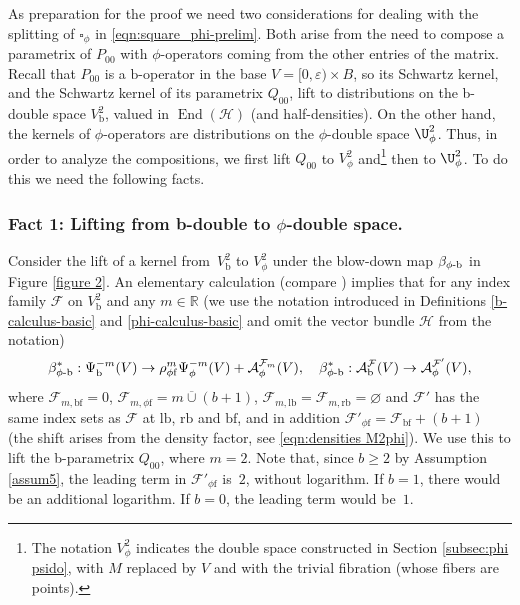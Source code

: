 \documentclass[JEP,XML,SOM,Unicode,NoFloatCountersInSection,published]{cedram}
\newcommand{\phib}{{\phi\textup{-}\bb}}
\theoremstyle{plain}
\theoremstyle{definition}
\newcommand{\R}{{\mathbb{R}}}
\newcommand{\Hmath}{{\mathscr{H}}}
\newcommand\calA{{\mathcal A}}
\newcommand\calF{{\mathcal F}}
\newcommand{\phif}{{\phi\mathrm{f}}}
\newcommand{\lf}{{\mathrm{lb}}}
\newcommand{\rf}{{\mathrm{rb}}}
\newcommand{\bb}{{\mathrm{b}}}
\newcommand{\bbf}{{\mathrm{bf}}}
\DeclareMathOperator{\End}{End}
\newcommand{\ocup}{\mathbin{\overline{\cup}}}
\begin{document}
As preparation for the proof we need two considerations for dealing with the splitting of $\square_\phi$ in
\eqref{eqn:square_phi-prelim}. Both arise from the need to compose a parametrix of $P_{00}$ with $\phi$\nobreakdash-operators coming from the other entries of the matrix. Recall that $P_{00}$ is a $\bb$\nobreakdash-operator in the base $V=[0,\varepsilon) \times B$, so its
Schwartz kernel, and the Schwartz kernel of its parametrix $Q_{00}$, lift to distributions on the b-double space
$V^2_\bb$, valued in $\End(\mathscr{H})$ (and half-densities). On the other hand, the kernels of $\phi$-operators are distributions on the $\phi$-double space $\U^2_\phi$. Thus, in order to analyze the compositions, we first lift $Q_{00}$ to $V^2_\phi$ and\footnote{The notation $V^2_\phi$ indicates the double space constructed in Section \ref{subsec:phi psido}, with $M$ replaced by $V$ and with the trivial fibration (whose fibers are points).} then to $\U^2_\phi$. To do this we need the following facts.

\subsubsection*{Fact 1: Lifting from b-double to $\phi$-double space.}

Consider the lift of a kernel from~$V^2_\bb$ to $V^2_\phi$ under the blow-down
map $\beta_{\phib}$ in Figure \ref{figure 2}. An elementary calculation
(compare \cite[Prop.\,1]{grieser-para}) implies that for any index
family $\calF$ on $V^2_\bb$ and any $m\in\R$ (we use the notation introduced in
Definitions \ref{b-calculus-basic} and \ref{phi-calculus-basic} and omit the vector bundle $\Hmath$ from the notation)
\begin{equation}
\label{eqn:lifting}
\beta_{\phib}^*: \Psi_\bb^{-m}(V) \to \rho_\phif^m\Psi_\phi^{-m}(V) +\calA^{\calF_m}_\phi(V),
\quad \beta_{\phib}^*: \calA^{\calF}_\bb(V) \to \calA^{\calF'}_\phi(V),
\end{equation}
where $\calF_{m,\bbf}=0$, $\calF_{m,\phif}=m \ocup (b+1)$, $\calF_{m,\lf}=\calF_{m,\rf}=\varnothing$
and $\calF'$ has the same index sets as $\calF$ at $\lf$, $\rf$ and $\bbf$, and in addition
$\calF'_\phif = \calF_\bbf+(b+1)$ (the shift arises from the density factor, see \eqref{eqn:densities M2phi}).
We use this to lift the b-parametrix $Q_{00}$, where $m=2$. Note that, since $b\geq2$ by Assumption \ref{assum5}, the leading term in $\calF'_\phif$ is~$2$, without logarithm. If $b\!=\!1$, there would be an additional logarithm. If $b\!=\!0$, the leading term would be~$1$.
\end{document}
